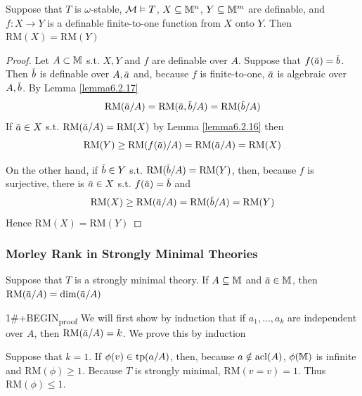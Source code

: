 \documentclass[11pt]{article}
\def \RM {\text{RM}}
\begin{document}
\begin{corollary}[]
Suppose that \(T\) is \(\omega\)-stable, \(\mathcal{M}\vDash T\), \(X\subseteq\mathbb{M}^n\), \(Y\subseteq\mathbb{M}^m\) are definable, and \(f:X\to Y\) is a
definable finite-to-one function from \(X\) onto \(Y\). Then \(\RM(X)=\RM(Y)\)
\end{corollary}

\begin{proof}
Let \(A\subset\mathbb{M}\) s.t. \(X,Y\) and \(f\) are definable over \(A\). Suppose that \(f(\bara)=\barb\).
Then \(\barb\) is definable over \(A,\bara\) and, because \(f\) is finite-to-one, \(\bara\) is
algebraic over \(A,\barb\). By Lemma \ref{lemma6.2.17}
\begin{equation*}
\RM(\bara/A)=\RM(\bara,\barb/A)=\RM(\barb/A)
\end{equation*}
If \(\bara\in X\) s.t. \(\RM(\bara/A)=\RM(X)\) by Lemma \ref{lemma6.2.16} then
\begin{equation*}
\RM(Y)\ge\RM(f(\bara)/A)=\RM(\bara/A)=\RM(X)
\end{equation*}

On the other hand, if \(\barb\in Y\) s.t. \(\RM(\barb/A)=\RM(Y)\), then, because \(f\) is
surjective, there is \(\bara\in X\) s.t. \(f(\bara)=\barb\) and
\begin{equation*}
\RM(X)\ge\RM(\bara/A)=\RM(\barb/A)=\RM(Y)
\end{equation*}
Hence \(\RM(X)=\RM(Y)\)
\end{proof}
\subsubsection{Morley Rank in Strongly Minimal Theories}
\label{sec:orga4b6154}
\begin{theorem}[]
Suppose that \(T\) is a strongly minimal theory. If \(A\subseteq\mathbb{M}\) and \(\bara\in\M\), then \(\RM(\bara/A)=\dim(\bara/A)\)
\end{theorem}

1\#+BEGIN\textsubscript{proof}
We will first show by induction that if \(a_1,\dots,a_k\) are independent over \(A\),
then \(\RM(\bara/A)=k\). We prove this by induction

Suppose that \(k=1\). If \(\phi(v)\in\operatorname{tp}(a/A)\), then, because \(a\notin\operatorname{acl}(A)\), \(\phi(\mathbb{M})\) is infinite
and \(\RM(\phi)\ge 1\). Because \(T\) is strongly minimal, \(\RM(v=v)=1\). Thus \(\RM(\phi)\le 1\).
\end{document}
